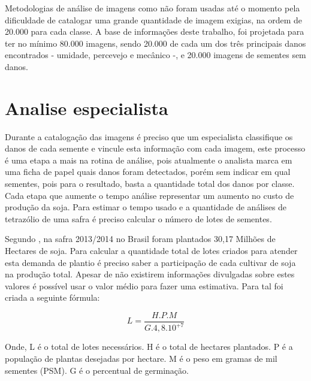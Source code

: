 Metodologias de análise de imagens como  não foram usadas até o momento pela dificuldade de catalogar uma grande quantidade de imagem exigias, na ordem de 20.000 para cada classe. A base de informações deste trabalho, foi projetada para ter no mínimo 80.000 imagens, sendo 20.000 de cada um dos três principais danos encontrados - umidade, percevejo e mecânico -, e 20.000 imagens de sementes sem danos.


\section{Analise especialista}


Durante a catalogação das imagens é preciso que um especialista classifique os danos de cada semente e vincule esta informação com cada imagem, este processo é uma etapa a mais na rotina de análise, pois atualmente o analista marca em uma ficha de papel quais danos foram detectados, porém sem indicar em qual sementes, pois para o resultado, basta a quantidade total dos danos por classe. Cada etapa que aumente o tempo análise representar um aumento no custo de produção da soja. Para estimar o tempo usado e a quantidade de análises de tetrazólio de uma safra é preciso calcular o número de lotes de sementes. 

Segundo \cite{FAS2018}, na safra 2013/2014  no Brasil foram plantados 30,17 Milhões de Hectares de soja. Para calcular a quantidade total de lotes criados para atender esta demanda de plantio é preciso saber a participação de cada cultivar de soja na produção total. Apesar de não existirem informações divulgadas sobre estes valores é possível usar o valor médio para fazer uma estimativa. Para tal foi criada a seguinte fórmula: 

\begin{equation}
L = \frac{H.P.M}{G. 4,8.10^{+7}} 
\end{equation}

Onde,
L é o total de lotes necessários.
H é o total de hectares plantados.
P é a população de plantas desejadas por hectare.
M é o peso em gramas de mil sementes (PSM).
G é o percentual de germinação.

